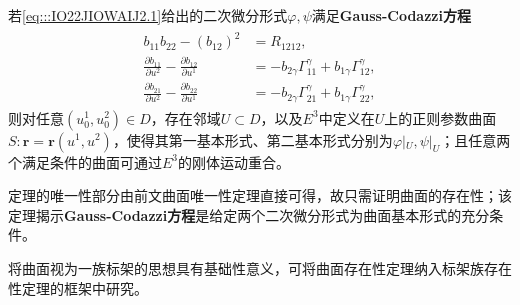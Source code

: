 \documentclass[../../main.tex]{subfiles}%
\begin{document}
\begin{theorem}
若\eqref{eq:::IO22JIOWAIJ2.1}给出的二次微分形式$\varphi,\psi$满足\textbf{Gauss-Codazzi方程}
\begin{align}
\begin{split}
b_{11}b_{22}-(b_{12})^2 &= R_{1212},\\
\frac{\partial b_{11}}{\partial u^2}-\frac{\partial b_{12}}{\partial u^1} &= -b_{2\gamma}\Gamma^\gamma_{11}+b_{1\gamma}\Gamma^\gamma_{12},\\
\frac{\partial b_{21}}{\partial u^2}-\frac{\partial b_{22}}{\partial u^1} &= -b_{2\gamma}\Gamma^\gamma_{21}+b_{1\gamma}\Gamma^\gamma_{22},
\end{split}
\label{eq:::IO22JIOWAIJ2.6}
\end{align}
则对任意$(u_0^1,u_0^2) \in D$，存在邻域$U \subset D$，以及$E^3$中定义在$U$上的正则参数曲面$S: \boldsymbol{r}=\boldsymbol{r}(u^1,u^2)$，使得其第一基本形式、第二基本形式分别为$\varphi|_U,\psi|_U$；且任意两个满足条件的曲面可通过$E^3$的刚体运动重合。
\end{theorem}
\begin{remark}
定理的唯一性部分由前文曲面唯一性定理直接可得，故只需证明曲面的存在性；该定理揭示\textbf{Gauss-Codazzi方程}是给定两个二次微分形式为曲面基本形式的充分条件。
\end{remark}
\begin{remark}
将曲面视为一族标架的思想具有基础性意义，可将曲面存在性定理纳入标架族存在性定理的框架中研究。
\end{remark}
\end{document}
